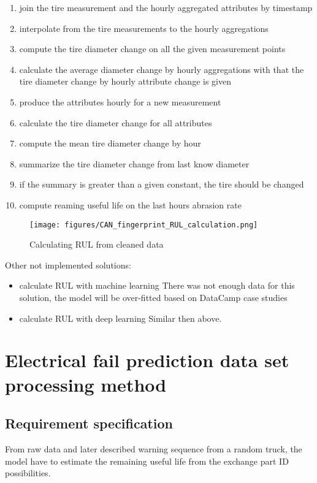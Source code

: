 	\begin{enumerate}
		\item{join the tire measurement and the hourly aggregated attributes by timestamp}
		\item{interpolate from the tire measurements to the hourly aggregations}
		\item{compute the tire diameter change on all the given measurement points}
		\item{calculate the average diameter change by hourly aggregations} with that the tire diameter change by hourly attribute change is given
		\item{produce the attributes hourly for a new measurement}
		\item{calculate the tire diameter change for all attributes}
		\item{compute the mean tire diameter change by hour}
		\item{summarize the tire diameter change from last know diameter}
		\item{if the summary is greater than a given constant, the tire should be changed}
		\item{compute reaming useful life on the last hours abrasion rate}
	\end{enumerate}
	\begin{figure}[!ht]
		\centering
		\texttt{[image: figures/CAN\_fingerprint\_RUL\_calculation.png]}
		\caption{Calculating RUL from cleaned data} 
	\end{figure}
		\noindent
	Other not implemented solutions:
	\begin{itemize}
		\item{calculate RUL with machine learning} There was not enough data for this solution, the model will be over-fitted based on DataCamp case studies \cite{DataCamp_CaseStudies} 
		\item{calculate RUL with deep learning} Similar then above.	
	\end{itemize}
	
\section{Electrical fail prediction data set processing method}
	\subsection{Requirement specification}
From raw data and later described warning sequence from a random truck, the model have to estimate the remaining useful life from the exchange part ID possibilities.	
